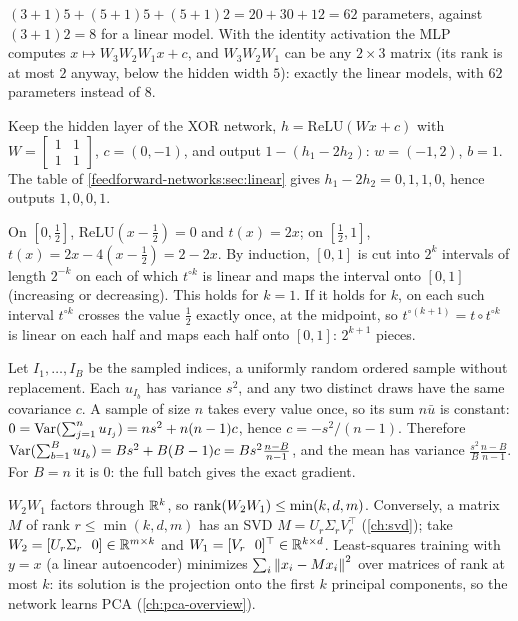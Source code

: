 $(3 + 1)5 + (5 + 1)5 + (5 + 1)2 = 20 + 30 + 12 = 62$ parameters, against $(3 + 1)2 = 8$ for a linear model. With the
identity activation the MLP computes $x\mapsto W_3W_2W_1x + c$, and $W_3W_2W_1$ can be any $2\times3$ matrix (its rank is at most
$2$ anyway, below the hidden width $5$): exactly the linear models, with $62$ parameters instead of $8$.

Keep the hidden layer of the XOR network, $h = \mathrm{ReLU}(Wx + c)$ with $W = \begin{bmatrix}1&1\\1&1\end{bmatrix}$, $c = (0,-1)$, and output
$1 - (h_1 - 2h_2)$: $w = (-1, 2)$, $b = 1$. The table of \cref{feedforward-networks:sec:linear} gives $h_1 - 2h_2 = 0, 1, 1, 0$,
hence outputs $1, 0, 0, 1$.

On $[0,\frac12]$, $\mathrm{ReLU}(x - \frac12) = 0$ and $t(x) = 2x$; on $[\frac12,1]$, $t(x) = 2x - 4(x - \frac12) = 2 - 2x$. By induction, $[0,1]$ is cut
into $2^k$ intervals of length $2^{-k}$ on each of which $t^{\circ k}$ is linear and maps the interval onto $[0,1]$
(increasing or decreasing). This holds for $k = 1$. If it holds for $k$, on each such interval
$t^{\circ k}$ crosses the value $\frac12$ exactly once, at the midpoint, so $t^{\circ(k+1)} = t\circ t^{\circ k}$ is linear on each half and maps each
half onto $[0,1]$: $2^{k+1}$ pieces.

Let $I_1,\dots,I_B$ be the sampled indices, a uniformly random ordered sample without replacement. Each $u_{I_b}$ has
variance $s^2$, and any two distinct draws have the same covariance $c$. A sample of size $n$ takes every
value once, so its sum $n\bar u$ is constant: $0 = \operatorname{Var}(\sum_{j=1}^nu_{I_j}) = ns^2 + n(n - 1)c$, hence $c = -s^2/(n - 1)$. Therefore
$\operatorname{Var}(\sum_{b=1}^Bu_{I_b}) = Bs^2 + B(B - 1)c = Bs^2\frac{n - B}{n - 1}$, and the mean has variance $\frac{s^2}B\frac{n - B}{n - 1}$. For $B = n$ it is $0$:
the full batch gives the exact gradient.

$W_2W_1$ factors through $\mathbb{R}^k$, so $\operatorname{rank}(W_2W_1)\leq\min(k, d, m)$. Conversely, a matrix $M$ of rank $r\leq\min(k,d,m)$ has an SVD
$M = U_r\Sigma_rV_r^\top$ (\cref{ch:svd}); take $W_2 = [U_r\Sigma_r\ \ 0]\in\mathbb{R}^{m\times k}$ and $W_1 = [V_r\ \ 0]^\top\in\mathbb{R}^{k\times d}$. Least-squares training
with $y = x$ (a linear autoencoder) minimizes $\sum_i\left\|x_i - Mx_i\right\|^2$ over matrices of rank at most $k$: its solution is
the projection onto the first $k$ principal components, so the network learns PCA
(\cref{ch:pca-overview}).

